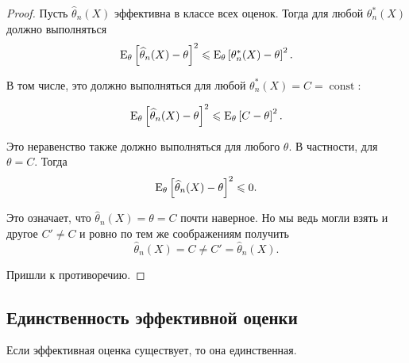 \begin{proof}
    Пусть $\widehat{\theta}_n(X)$ эффективна в классе всех оценок. Тогда для любой $\theta_n^*(X)$ должно выполняться
    \begin{equation*}
        \operatorname{E}_{\theta} \left[ \widehat{\theta}_n(X) - \theta \right]^2 \leqslant \operatorname{E}_{\theta} \left[ \theta^*_n(X) - \theta \right]^2
    .\end{equation*}

    В том числе, это должно выполняться для любой $\theta_n^*(X) = C = \operatorname{const}$:

    \begin{equation*}
        \operatorname{E}_{\theta} \left[ \widehat{\theta}_n(X) - \theta \right]^2 \leqslant \operatorname{E}_{\theta} \left[ C - \theta \right]^2.
    \end{equation*}

    Это неравенство также должно выполняться для любого $\theta$. В частности, для $\theta = C$. Тогда
    \begin{equation*}
        \operatorname{E}_{\theta} \left[ \widehat{\theta}_n(X) - \theta \right]^2 \leqslant 0.
    \end{equation*}

    Это означает, что $\widehat{\theta}_n(X) = \theta = C$ почти наверное. Но мы ведь могли взять и другое $C' \neq C$ и ровно по тем же соображениям получить
    \begin{equation*}
        \widehat{\theta}_n(X) = C \neq C' = \widehat{\theta}_n(X).
    \end{equation*}

    Пришли к противоречию.
\end{proof}

\subsection{Единственность эффективной оценки}

\begin{proposition*}
    Если эффективная оценка существует, то она единственная.
\end{proposition*}

